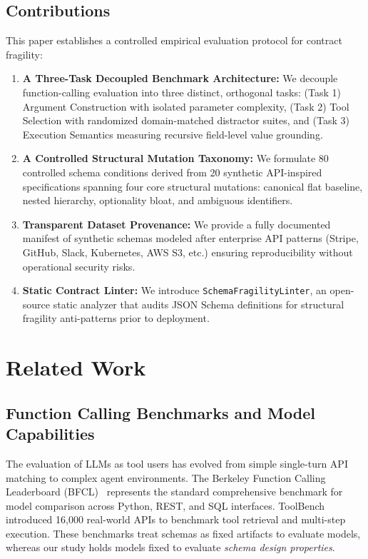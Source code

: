 \documentclass[10pt,conference]{IEEEtran}
\begin{document}
\subsection{Contributions}
This paper establishes a controlled empirical evaluation protocol for contract fragility:
\begin{enumerate}
    \item \textbf{A Three-Task Decoupled Benchmark Architecture:} We decouple function-calling evaluation into three distinct, orthogonal tasks: (Task 1) Argument Construction with isolated parameter complexity, (Task 2) Tool Selection with randomized domain-matched distractor suites, and (Task 3) Execution Semantics measuring recursive field-level value grounding.
    \item \textbf{A Controlled Structural Mutation Taxonomy:} We formulate 80 controlled schema conditions derived from 20 synthetic API-inspired specifications spanning four core structural mutations: canonical flat baseline, nested hierarchy, optionality bloat, and ambiguous identifiers.
    \item \textbf{Transparent Dataset Provenance:} We provide a fully documented manifest of synthetic schemas modeled after enterprise API patterns (Stripe, GitHub, Slack, Kubernetes, AWS S3, etc.) ensuring reproducibility without operational security risks.
    \item \textbf{Static Contract Linter:} We introduce \texttt{SchemaFragilityLinter}, an open-source static analyzer that audits JSON Schema definitions for structural fragility anti-patterns prior to deployment.
\end{enumerate}

\section{Related Work}

\subsection{Function Calling Benchmarks and Model Capabilities}
The evaluation of LLMs as tool users has evolved from simple single-turn API matching to complex agent environments. The Berkeley Function Calling Leaderboard (BFCL)~\cite{patil2025bfcl} represents the standard comprehensive benchmark for model comparison across Python, REST, and SQL interfaces. ToolBench~\cite{qin2023toolbench} introduced 16,000 real-world APIs to benchmark tool retrieval and multi-step execution. These benchmarks treat schemas as fixed artifacts to evaluate models, whereas our study holds models fixed to evaluate \textit{schema design properties}.
\end{document}
